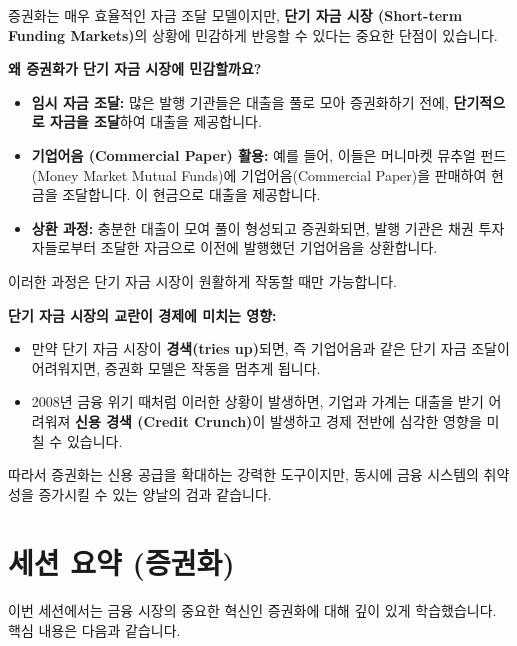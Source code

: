 \documentclass[11pt,a4paper]{article}
\theoremstyle{definition}
\begin{document}
증권화는 매우 효율적인 자금 조달 모델이지만, \textbf{단기 자금 시장 (Short-term Funding Markets)}의 상황에 민감하게 반응할 수 있다는 중요한 단점이 있습니다.

\begin{tcolorbox}[
    colback=boxred,
    colframe=red!70!black,
    title=\textbf{단기 자금 시장과 증권화의 연결고리}
]
  \textbf{왜 증권화가 단기 자금 시장에 민감할까요?}
  \begin{itemize}
    \item \textbf{임시 자금 조달:} 많은 발행 기관들은 대출을 풀로 모아 증권화하기 전에, \textbf{단기적으로 자금을 조달}하여 대출을 제공합니다.
    \item \textbf{기업어음 (Commercial Paper) 활용:} 예를 들어, 이들은 머니마켓 뮤추얼 펀드(Money Market Mutual Funds)에 기업어음(Commercial Paper)을 판매하여 현금을 조달합니다. 이 현금으로 대출을 제공합니다.
    \item \textbf{상환 과정:} 충분한 대출이 모여 풀이 형성되고 증권화되면, 발행 기관은 채권 투자자들로부터 조달한 자금으로 이전에 발행했던 기업어음을 상환합니다.
  \end{itemize}
  이러한 과정은 단기 자금 시장이 원활하게 작동할 때만 가능합니다.

  \textbf{단기 자금 시장의 교란이 경제에 미치는 영향:}
  \begin{itemize}
    \item 만약 단기 자금 시장이 \textbf{경색(tries up)}되면, 즉 기업어음과 같은 단기 자금 조달이 어려워지면, 증권화 모델은 작동을 멈추게 됩니다.
    \item 2008년 금융 위기 때처럼 이러한 상황이 발생하면, 기업과 가계는 대출을 받기 어려워져 \textbf{신용 경색 (Credit Crunch)}이 발생하고 경제 전반에 심각한 영향을 미칠 수 있습니다.
  \end{itemize}
  따라서 증권화는 신용 공급을 확대하는 강력한 도구이지만, 동시에 금융 시스템의 취약성을 증가시킬 수 있는 양날의 검과 같습니다.
\end{tcolorbox}

\newpage
\section{세션 요약 (증권화)}

이번 세션에서는 금융 시장의 중요한 혁신인 증권화에 대해 깊이 있게 학습했습니다. 핵심 내용은 다음과 같습니다.
\end{document}
